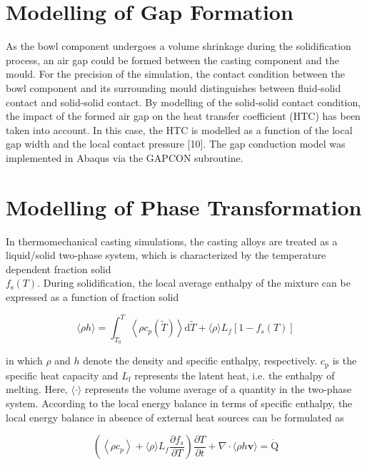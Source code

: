 \documentclass[10pt]{article}
\begin{document}
\section*{Modelling of Gap Formation}
As the bowl component undergoes a volume shrinkage during the solidification process, an air gap could be formed between the casting component and the mould. For the precision of the simulation, the contact condition between the bowl component and its surrounding mould distinguishes between fluid-solid contact and solid-solid contact. By modelling of the solid-solid contact condition, the impact of the formed air gap on the heat transfer coefficient (HTC) has been taken into account. In this case, the HTC is modelled as a function of the local gap width and the local contact pressure [10]. The gap conduction model was implemented in Abaqus via the GAPCON subroutine.

\section*{Modelling of Phase Transformation}
In thermomechanical casting simulations, the casting alloys are treated as a liquid/solid two-phase system, which is characterized by the temperature dependent fraction solid\\
$f_{\mathrm{s}}(T)$. During solidification, the local average enthalpy of the mixture can be expressed as a function of fraction solid


\begin{equation*}
\langle\rho h\rangle=\int_{T_{0}}^{T}\left\langle\rho c_{p}(\tilde{T})\right\rangle \mathrm{d} \tilde{T}+\langle\rho\rangle L_{f}\left[1-f_{s}(T)\right] \tag{1}
\end{equation*}


in which $\rho$ and $h$ denote the density and specific enthalpy, respectively. $c_{\mathrm{p}}$ is the specific heat capacity and $L_{\mathrm{f}}$ represents the latent heat, i.e. the enthalpy of melting. Here, $\langle\cdot\rangle$ represents the volume average of a quantity in the two-phase system. According to the local energy balance in terms of specific enthalpy, the local energy balance in absence of external heat sources can be formulated as


\begin{equation*}
\left(\left\langle\rho c_{p}\right\rangle+\langle\rho\rangle L_{f} \frac{\partial f_{s}}{\partial T}\right) \frac{\partial T}{\partial t}+\nabla \cdot\langle\rho h \mathbf{v}\rangle=\dot{\mathrm{Q}} \tag{2}
\end{equation*}
\end{document}
